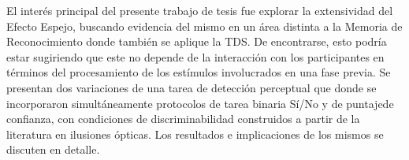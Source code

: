 El interés principal del presente trabajo de tesis fue explorar la extensividad del Efecto Espejo, buscando evidencia del mismo en un área distinta a la Memoria de Reconocimiento donde también se aplique la TDS. De encontrarse, esto podría estar sugiriendo que este no depende de la interacción con los participantes en términos del procesamiento de los estímulos involucrados en una fase previa. Se presentan dos variaciones de una tarea de detección perceptual que donde se incorporaron simultáneamente protocolos de tarea binaria Sí/No y de puntajede confianza, con condiciones de discriminabilidad construidos a partir de la literatura en ilusiones ópticas. Los resultados e implicaciones de los mismos se discuten en detalle.\\